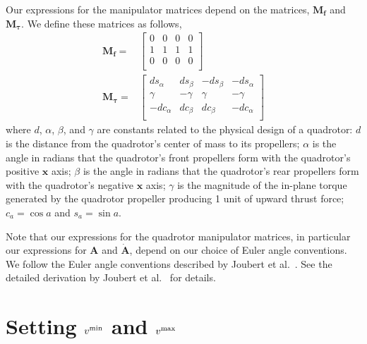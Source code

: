 Our expressions for the manipulator matrices depend on the matrices, $\mathbf{M}_{\mathbf{f}}$ and $\mathbf{M}_{\mathbf{\tau}}$.
We define these matrices as follows, 
%
\footnotesize
\begin{equation}
\begin{aligned}
%
\mathbf{M}_{\mathbf{f}} = &
\begin{bmatrix}
0 & 0 & 0 & 0 \\
1 & 1 & 1 & 1 \\
0 & 0 & 0 & 0 \\
\end{bmatrix}\\
%
\mathbf{M}_{\mathbf{\tau}} = &
\begin{bmatrix}
 ds_\alpha & ds_\beta & -ds_\beta & -ds_\alpha \\
\gamma     & -\gamma  & \gamma    & -\gamma    \\
-dc_\alpha & dc_\beta & dc_\beta  & -dc_\alpha \\
\end{bmatrix}
%
\end{aligned}
\end{equation}
\normalsize
where $d$, $\alpha$, $\beta$, and $\gamma$ are constants related to the physical design of a quadrotor:
$d$ is the distance from the quadrotor's center of mass to its propellers;
$\alpha$ is the angle in radians that the quadrotor's front propellers form with the quadrotor's positive $\mathbf{x}$ axis;
$\beta$ is the angle in radians that the quadrotor's rear propellers form with the quadrotor's negative $\mathbf{x}$ axis;
$\gamma$ is the magnitude of the in-plane torque generated by the quadrotor propeller producing 1 unit of upward thrust force;
$c_a=\cos a$ and $s_a=\sin a$.

Note that our expressions for the quadrotor manipulator matrices, in particular our expressions for $\mathbf{A}$ and $\mathbf{\dot{A}}$, depend on our choice of Euler angle conventions.
We follow the Euler angle conventions described by Joubert et al.~.
See the detailed derivation by Joubert et al.~ for details.

\section{Setting $v^{\text{\textrm{\textmd{min}}}}$ and $v^{\text{\textrm{\textmd{max}}}}$}
\label{app:v_min_v_max}

